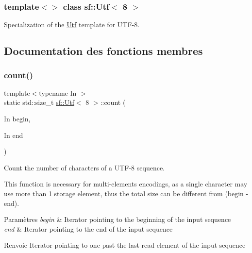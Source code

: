 \subsubsection*{template$<$$>$\newline
class sf\+::\+Utf$<$ 8 $>$}

Specialization of the \hyperlink{classsf_1_1Utf}{Utf} template for U\+T\+F-\/8. 

\subsection{Documentation des fonctions membres}
\mbox{\label{classsf_1_1Utf_3_018_01_4_af1f15d9a772ee887be39e97431e15d32}} 
\subsubsection{\texorpdfstring{count()}{count()}}
{\footnotesize\ttfamily template$<$typename In $>$ \\
static std\+::size\+\_\+t \hyperlink{classsf_1_1Utf}{sf\+::\+Utf}$<$ 8 $>$\+::count (\begin{DoxyParamCaption}\item[{In}]{begin,  }\item[{In}]{end }\end{DoxyParamCaption})\hspace{0.3cm}{\ttfamily [static]}}



Count the number of characters of a U\+T\+F-\/8 sequence. 

This function is necessary for multi-\/elements encodings, as a single character may use more than 1 storage element, thus the total size can be different from (begin -\/ end).


\begin{DoxyParams}{Paramètres}
{\em begin} & Iterator pointing to the beginning of the input sequence \\
\hline
{\em end} & Iterator pointing to the end of the input sequence\\
\hline
\end{DoxyParams}
\begin{DoxyReturn}{Renvoie}
Iterator pointing to one past the last read element of the input sequence 
\end{DoxyReturn}
\mbox{\label{classsf_1_1Utf_3_018_01_4_a59d4e8d5832961e62b263d308b72bf4b}} 
